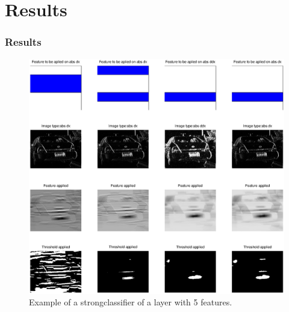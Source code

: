 \documentclass{beamer}
\begin{document}
\section{Results}
\frame
{
  \frametitle{Results}
	\begin{figure}[!ht]
	\centering
	\includegraphics[width=18cm]{../report/img/strongClassifier_layer2_img14}
	\caption{Example of a strongclassifier of a layer with 5 features.}
	\label{fig:strongclassify}
	\end{figure}
}

\end{document}
